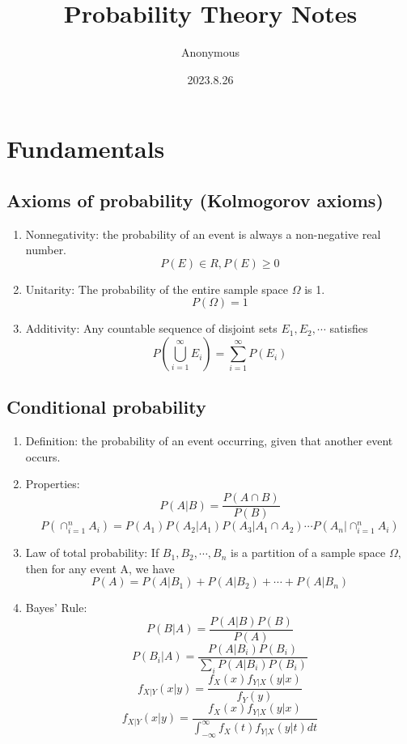 \documentclass[a4paper]{article}
\title{Probability Theory Notes}
\author{Anonymous}
\date{2023.8.26}
\begin{document}
\maketitle
\tableofcontents

\section{Fundamentals}
\subsection{Axioms of probability (Kolmogorov axioms)}
	\begin{enumerate}
	\item Nonnegativity: the probability of an event is always a non-negative real number.
$$P(E)\in R,P(E)\geq0$$
	\item Unitarity: The probability of the entire sample space $\Omega$ is 1.
$$P(\Omega)=1$$
	\item Additivity: Any countable sequence of disjoint sets $E_1,E_2,\cdots$ satisfies
$$P(\bigcup_{i=1}^{\infty}E_i)=\sum_{i=1}^{\infty}P(E_i)$$
	\end{enumerate}

\subsection{Conditional probability}
	\begin{enumerate}
	\item Definition: the probability of an event occurring, given that another event occurs.
	\item Properties:
$$P(A|B)=\frac{P(A\cap B)}{P(B)}$$
$$P(\cap_{i=1}^nA_i)=P(A_1)P(A_2|A_1)P(A_3|A_1\cap A_2)\cdots P(A_n|\cap_{i=1}^nA_i)$$
	\item Law of total probability: If $B_1,B_2,\cdots,B_n$ is a partition of a sample space $\Omega$, then for any event A, we have
$$P(A)=P(A|B_1)+P(A|B_2)+\cdots+P(A|B_n)$$
	\item Bayes' Rule: 
$$P(B|A)=\frac{P(A|B)P(B)}{P(A)}$$
$$P(B_i|A)=\frac{P(A|B_i)P(B_i)}{\sum_iP(A|B_i)P(B_i)}$$
$$f_{X|Y}(x|y)=\frac{f_X(x)f_{Y|X}(y|x)}{f_Y(y)}$$
$$f_{X|Y}(x|y)=\frac{f_X(x)f_{Y|X}(y|x)}{\int_{-\infty}^{\infty}f_X(t)f_{Y|X}(y|t)dt}$$
	\end{enumerate}
\end{document}
